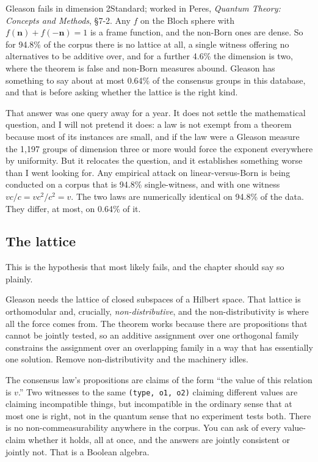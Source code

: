\begin{Theorem}{Gleason fails in dimension 2}{Standard; worked in Peres, \textit{Quantum Theory: Concepts and Methods}, \S7-2. Any $f$ on the Bloch sphere with $f(\mathbf{n}) + f(-\mathbf{n}) = 1$ is a frame function, and the non-Born ones are dense.}
So for 94.8\% of the corpus there is no lattice at all, a single witness offering no alternatives to be additive over, and for a further 4.6\% the dimension is two, where the theorem is false and non-Born measures abound. Gleason has something to say about at most 0.64\% of the consensus groups in this database, and that is before asking whether the lattice is the right kind.
\end{Theorem}

That answer was one query away for a year. It does not settle the mathematical question, and I will not pretend it does: a law is not exempt from a theorem because most of its instances are small, and if the law were a Gleason measure the 1{,}197 groups of dimension three or more would force the exponent everywhere by uniformity. But it relocates the question, and it establishes something worse than I went looking for. Any empirical attack on linear-versus-Born is being conducted on a corpus that is 94.8\% single-witness, and with one witness $vc/c = vc^2/c^2 = v$. The two laws are numerically identical on 94.8\% of the data. They differ, at most, on 0.64\% of it.

\subsection{The lattice}

This is the hypothesis that most likely fails, and the chapter should say so plainly.

Gleason needs the lattice of closed subspaces of a Hilbert space. That lattice is orthomodular and, crucially, \emph{non-distributive}, and the non-distributivity is where all the force comes from. The theorem works because there are propositions that cannot be jointly tested, so an additive assignment over one orthogonal family constrains the assignment over an overlapping family in a way that has essentially one solution. Remove non-distributivity and the machinery idles.

The consensus law's propositions are claims of the form ``the value of this relation is $v$.'' Two witnesses to the same \texttt{(type, o1, o2)} claiming different values are claiming incompatible things, but incompatible in the ordinary sense that at most one is right, not in the quantum sense that no experiment tests both. There is no non-commeasurability anywhere in the corpus. You can ask of every value-claim whether it holds, all at once, and the answers are jointly consistent or jointly not. That is a Boolean algebra.

